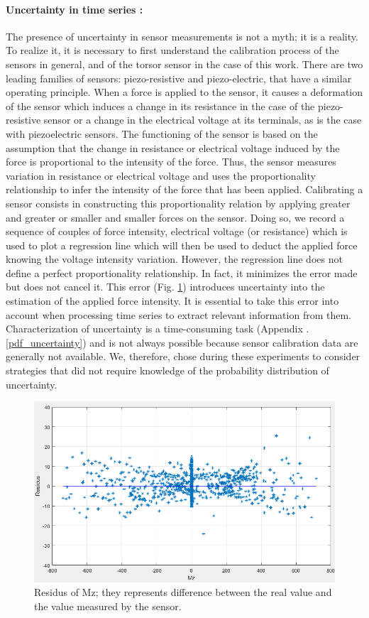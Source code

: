 \paragraph{Uncertainty in time series :} The presence of uncertainty in sensor measurements is not a myth; it is a reality. To realize it, it is necessary to first understand the calibration process of the sensors in general, and of the torsor sensor in the case of this work. 
There are two leading families of sensors: piezo-resistive and piezo-electric, that have a similar operating principle. When a force is applied to the sensor, it causes a deformation of the sensor which induces a change in its resistance in the case of the piezo-resistive sensor or a change in the electrical voltage at its terminals, as is the case with piezoelectric sensors. The functioning of the sensor is based on the assumption that the change in resistance or electrical voltage induced by the force is proportional to the intensity of the force. Thus, the  sensor measures variation in resistance or electrical voltage and uses the proportionality relationship to infer the intensity of the force that has been applied. Calibrating a sensor consists in constructing this proportionality relation by applying greater and greater or smaller and smaller forces on the sensor. Doing so, we record a sequence of couples of force intensity, electrical voltage (or resistance) which is used to plot a regression line which will then be used to deduct the applied force knowing the voltage intensity  variation. However, the regression line does not define a perfect proportionality relationship. In fact, it minimizes the error made but does not cancel it. This error (Fig. \ref{residus}) introduces uncertainty into the estimation of the applied force intensity. It is essential to take this error into account when processing time series to extract relevant information from them.
Characterization of uncertainty is a time-consuming task (Appendix .\ref{pdf_uncertainty}) and is not always possible because sensor calibration data are generally not available. We, therefore, chose during these experiments to consider strategies that did not require knowledge of the probability distribution of uncertainty.

\begin{figure}[h]
\center
\includegraphics[scale = 0.5]{images/residus}
\caption{Residus of Mz; they represents difference between the real value and the value measured by the sensor.}
\label{residus}
\end{figure}

